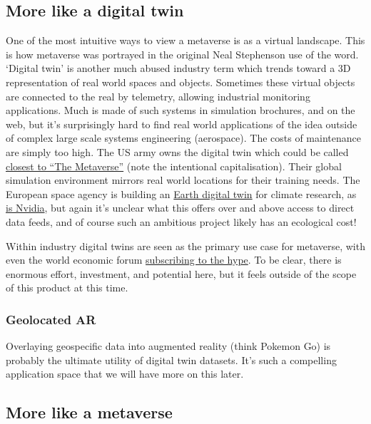 \subsection{More like a digital twin}
One of the most intuitive ways to view a metaverse is as a virtual landscape. This is how metaverse was portrayed in the original Neal Stephenson use of the word. `Digital twin' is another much abused industry term which trends toward a 3D representation of real world spaces and objects. Sometimes these virtual objects are connected to the real by telemetry, allowing industrial monitoring applications. Much is made of such systems in simulation brochures, and on the web, but it's surprisingly hard to find real world applications of the idea outside of complex large scale systems engineering (aerospace). The costs of maintenance are simply too high. The US army owns the digital twin which could be called \href{https://www.army.mil/standto/archive/2018/03/26/}{closest to ``The Metaverse''} (note the intentional capitalisation). Their global simulation environment mirrors real world locations for their training needs. The European space agency is building an \href{}{Earth digital twin} for climate research, as \href{https://www.nvidia.com/en-us/on-demand/session/gtcfall22-a41326/?playlistId=playList-9bb5405e-3e40-4ff3-88db-61cd3a4507e5#:~:text=Earth%2D2%20aims%20to%20improve,learning%20methods%20at%20unprecedented%20scale.}{is Nvidia}, but again it's unclear what this offers over and above access to direct data feeds, and of course such an ambitious project likely has an ecological cost!\par
Within industry digital twins are seen as the primary use case for metaverse, with even the world economic forum \href{https://www.weforum.org/agenda/2023/01/metaverse-biggest-impact-industry-davos2023/}{subscribing to the hype}. To be clear, there is enormous effort, investment, and potential here, but it feels outside of the scope of this product at this time.
\subsubsection{Geolocated AR}
Overlaying geospecific data into augmented reality (think Pokemon Go) is probably the ultimate utility of digital twin datasets. It's such a compelling application space that we will have more on this later.
\subsection{More like a metaverse}
